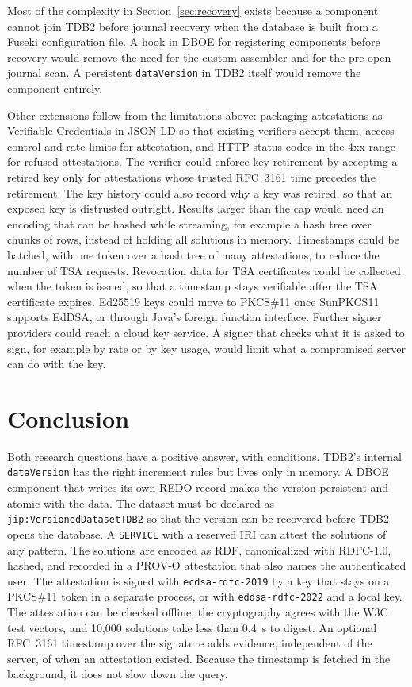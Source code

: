 \documentclass[11pt,a4paper]{article}
\newcommand{\code}[1]{\texttt{#1}}
\begin{document}
Most of the complexity in Section~\ref{sec:recovery} exists because a component cannot join
TDB2 before journal recovery when the database is built from a Fuseki configuration file. A
hook in DBOE for registering components before recovery would remove the need for the custom
assembler and for the pre-open journal scan. A persistent \code{dataVersion} in TDB2 itself
would remove the component entirely.

Other extensions follow from the limitations above: packaging attestations as Verifiable
Credentials in JSON-LD so that existing verifiers accept them, access control and rate limits
for attestation, and HTTP status codes in the 4xx range for refused attestations. The verifier
could enforce key retirement by accepting a retired key only for attestations whose trusted
RFC~3161 time precedes the retirement. The key history could also record why a key was
retired, so that an exposed key is distrusted outright. Results larger than the cap would need an encoding that can be hashed while
streaming, for example a hash tree over chunks of rows, instead of holding all solutions in
memory. Timestamps could be batched, with one token over a hash tree of many attestations, to
reduce the number of TSA requests. Revocation data for TSA certificates could be collected
when the token is issued, so that a timestamp stays verifiable after the TSA certificate
expires. Ed25519 keys could move to PKCS\#11 once SunPKCS11 supports EdDSA, or through Java's
foreign function interface. Further signer providers could reach a cloud key service. A signer
that checks what it is asked to sign, for example by rate or by key usage, would limit
what a compromised server can do with the key.

\section{Conclusion}
\label{sec:conclusion}

Both research questions have a positive answer, with conditions. TDB2's internal
\code{dataVersion} has the right increment rules but lives only in memory. A DBOE component
that writes its own REDO record makes the version persistent and atomic with the data. The
dataset must be declared as \code{jip:VersionedDatasetTDB2} so that the version can be
recovered before TDB2 opens the database. A \code{SERVICE} with a reserved IRI can attest the
solutions of any pattern. The solutions are encoded as RDF, canonicalized with RDFC-1.0,
hashed, and recorded in a PROV-O attestation that also names the authenticated user. The
attestation is signed with \code{ecdsa-rdfc-2019} by a key that stays on a PKCS\#11 token in a separate
process, or with \code{eddsa-rdfc-2022} and a local key. The attestation can be checked
offline, the cryptography agrees with the W3C test vectors, and 10,000 solutions take less
than 0.4~s to digest. An optional RFC~3161 timestamp over the signature adds evidence,
independent of the server, of when an attestation existed. Because the timestamp is fetched in
the background, it does not slow down the query.
\end{document}
